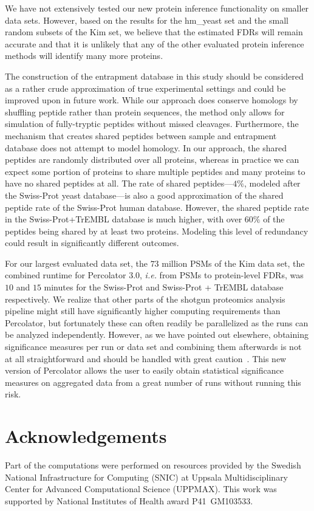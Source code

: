 \documentclass{article}
\begin{document}
We have not extensively tested our new protein inference functionality 
on smaller data sets. However, based on the results for the hm\_yeast 
set and the small random subsets of the Kim set, we believe that the 
estimated FDRs will remain accurate and that it is unlikely that any 
of the other evaluated protein inference methods will identify many 
more proteins.

The construction of the entrapment database in this study should be
considered as a rather crude approximation of true experimental
settings and could be improved upon in future work. While our approach
does conserve homologs by shuffling peptide rather than protein
sequences, the method only allows for simulation of fully-tryptic
peptides without missed cleavages.  Furthermore, the mechanism that
creates shared peptides between sample and entrapment database does
not attempt to model homology.  In our approach, the shared peptides
are randomly distributed over all proteins, whereas in practice we can
expect some portion of proteins to share multiple peptides and many
proteins to have no shared peptides at all. The rate of shared
peptides---$4\%$, modeled after the Swiss-Prot yeast database---is
also a good approximation of the shared peptide rate of the Swiss-Prot
human database. However, the shared peptide rate in the
Swiss-Prot+TrEMBL database is much higher, with over $60\%$ of the
peptides being shared by at least two proteins.  Modeling this level
of redundancy could result in significantly different outcomes.

For our largest evaluated data set, the $73$ million PSMs of the Kim 
data set, the combined runtime for Percolator 3.0, {\em i.e.} from 
PSMs to protein-level FDRs, was $10$ and $15$ minutes for the 
Swiss-Prot and Swiss-Prot + TrEMBL database respectively. We realize 
that other parts of the shotgun proteomics analysis pipeline might 
still have significantly higher computing requirements than 
Percolator, but fortunately these can often readily be parallelized as 
the runs can be analyzed independently. However, as we have pointed 
out elsewhere, obtaining significance measures per run or data set and 
combining them afterwards is not at all straightforward and should be 
handled with great caution~\cite{serang2015solution}. This new version 
of Percolator allows the user to easily obtain statistical 
significance measures on aggregated data from a great number of runs 
without running this risk.

\section*{Acknowledgements}

Part of the computations were performed on resources provided by the
Swedish National Infrastructure for Computing (SNIC) at Uppsala
Multidisciplinary Center for Advanced Computational Science (UPPMAX).
This work was supported by National Institutes of Health award
P41~GM103533.



\end{document}
